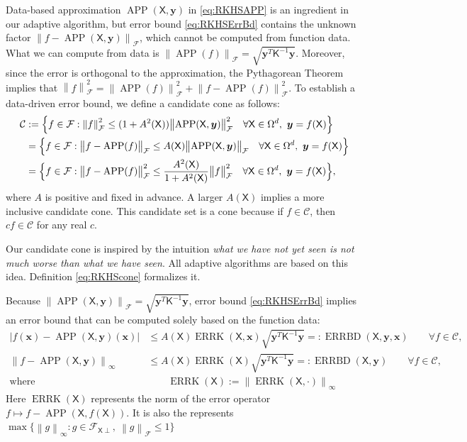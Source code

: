 \documentclass[]{mcom-l}
\theoremstyle{remark}
\DeclareMathOperator{\errK}{ERRK}
\DeclareMathOperator{\errBd}{ERRBD}
\DeclareMathOperator{\APP}{APP}
\newcommand{\mK}{\mathsf{K}}
\newcommand{\mX}{\mathsf{X}}
\newcommand{\bx}{{\boldsymbol{x}}}
\newcommand{\by}{{\boldsymbol{y}}}
\newcommand{\calc}{{\mathcal{C}}}
\newcommand{\calf}{{\mathcal{F}}}
\def\abs#1{\ensuremath{\left \lvert #1 \right \rvert}}
\newcommand{\norm}[2][{}]{\ensuremath{\left \lVert #2 \right \rVert}_{#1}}
\newcommand{\bignorm}[2][{}]{\ensuremath{\bigl \lVert #2 \bigr \rVert}_{#1}}
\begin{document}
Data-based approximation $\APP(\mX,\by)$ in \eqref{eq:RKHSAPP} is an ingredient in our adaptive algorithm, but error bound \eqref{eq:RKHSErrBd} contains the unknown factor $\norm[\calf]{f - \APP(\mX,\by)}$, which cannot be computed from function data.  What we can compute from data is $\bignorm[\calf]{\APP(f)} = \sqrt{\by^T \mK^{-1} \by}$.  Moreover, since the error is orthogonal to the approximation,  the Pythagorean Theorem implies that $\norm[\calf]{f}^2  = \bignorm[\calf]{\APP(f)}^2 + \bignorm[\calf]{f - \APP(f)}^2$.  To establish a data-driven error bound, we define a candidate cone as follows:
\begin{align} \label{eq:RKHScone}
\calc &:= \Bigl\{f \in \calf : \norm[\calf]{f}^2 \le (1 + A^2(\mX)) \bignorm[\calf]{\APP(\mX,\by)}^2 \quad \forall \mX \in \Omega^d, \ \by = f(\mX) \Bigr \} \\
\nonumber
& = \Bigl \{f \in \calf : \bignorm[\calf]{f - \APP(f)} \le A(\mX) \bignorm[\calf]{\APP(\mX,\by)} \quad \forall \mX \in \Omega^d, \ \by = f(\mX) \Bigr \} \\
\nonumber
& = \Bigl \{f \in \calf : \bignorm[\calf]{f - \APP(f)}^2 \le \frac{A^2(\mX)}{1 + A^2(\mX)} \bignorm[\calf]{f}^2 \quad \forall \mX \in \Omega^d, \ \by = f(\mX) \Bigr \},
\end{align}
where $A$ is positive and fixed in advance.  A larger $A(\mX)$ implies a more inclusive candidate cone.  This candidate set is a cone because if $f \in \calc$, then $c f \in \calc$ for any real $c$. 

Our candidate cone is inspired by the intuition \emph{what we have not yet seen is not much worse than what we have seen}. All adaptive algorithms are based on this idea. Definition \eqref{eq:RKHScone} formalizes it. 

Because $\bignorm[\calf]{\APP(\mX,\by)} = \sqrt{\by^T \mK^{-1} \by}$, error bound \eqref{eq:RKHSErrBd} implies an error bound that can be computed solely based on the function data: 
\begin{subequations} \label{eq:DataErrBd}
\begin{align}
\label{eq:DataErrBdA}
    \abs{f(\bx) - \APP(\mX,\by)(\bx)} & \le   A(\mX) \errK(\mX,\bx) \sqrt{\by^T \mK^{-1} \by } =: \errBd(\mX,\by,\bx) \qquad \forall f \in \calc, \\
    \label{eq:DataErrBdB}
    \norm[\infty]{f - \APP(\mX,\by)} & \le   A(\mX) \errK(\mX) \sqrt{\by^T \mK^{-1} \by } =: \errBd(\mX,\by) \qquad \forall f \in \calc, \\
    \text{where }& \qquad \errK(\mX) := \norm[\infty]{\errK(\mX,\cdot)} 
\end{align}
\end{subequations}
Here $\errK(\mX)$ represents the norm of the error operator $f \mapsto f-\APP(\mX,f(\mX))$.  It is also the represents $\max \{\norm[\infty]{g} : g \in \calf_{\mX \perp}, \ \norm[\calf]{g} \le 1\}$
\end{document}
